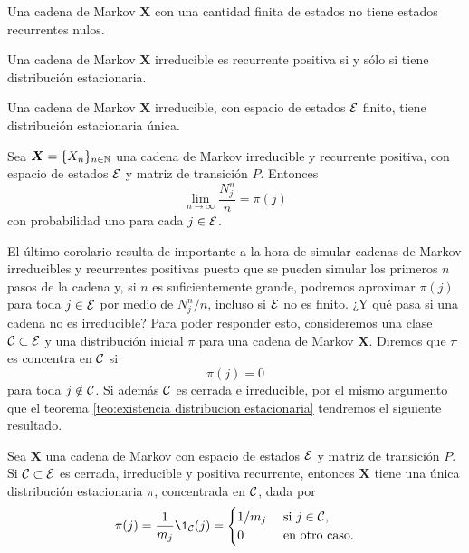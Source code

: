\begin{corollary}
    Una cadena de Markov $\bm X$ con una cantidad finita de estados no tiene estados recurrentes nulos.
\end{corollary}

\begin{corollary}
    Una cadena de Markov $\bm X$ irreducible es recurrente positiva si y sólo si tiene distribución estacionaria.
\end{corollary}

\begin{corollary}
    Una cadena de Markov $\bm X$ irreducible, con espacio de estados $\mathcal{E}$ finito, tiene distribución estacionaria única.
\end{corollary}

\begin{corollary}
    Sea $\bm X = \{X_n\}_{n \in \mathbb{N}}$ una cadena de Markov irreducible y recurrente positiva, con espacio de estados $\mathcal{E}$ y matriz de transición $P$. Entonces
    \[
        \lim_{n \to \infty} \frac{N_j^n}{n} = \pi(j)    
    \] con probabilidad uno para cada $j \in \mathcal{E}$.
\end{corollary}

El último corolario resulta de importante a la hora de simular cadenas de Markov irreducibles y recurrentes positivas puesto que se pueden simular los primeros $n$ pasos de la cadena y, si $n$ es suficientemente grande, podremos aproximar $\pi(j)$ para toda $j \in \mathcal{E}$ por medio de $N_j^n / n$, incluso si $\mathcal{E}$ no es finito. ¿Y qué pasa si una cadena no es irreducible? Para poder responder esto, consideremos una clase $\mathcal{C} \subset \mathcal{E}$ y una distribución inicial $\pi$ para una cadena de Markov $\bm X$. Diremos que $\pi$ es concentra en $\mathcal{C}$ si 
\[
    \pi(j) = 0
\]
para toda $j \notin \mathcal{C}$. Si además $\mathcal{C}$ es cerrada e irreducible, por el mismo argumento que el teorema \ref{teo:existencia distribucion estacionaria} tendremos el siguiente resultado.

\begin{theorem} \label{teo:distribucion estacionaria reducible}
    Sea $\bm X$ una cadena de Markov con espacio de estados $\mathcal{E}$ y matriz de transición $P$. Si $\mathcal{C} \subset \mathcal{E}$  es cerrada, irreducible y positiva recurrente, entonces $\bm X$ tiene una única distribución estacionaria $\pi$, concentrada en $\mathcal{C}$, dada por
    \[
        \pi(j) = \frac 1 {m_j} \1_{\Cc}(j) = \begin{cases}
            1/m_j & \text{ si } j \in \Cc,\\
            0 & \text{ en otro caso}.
        \end{cases}
    \]
\end{theorem}

